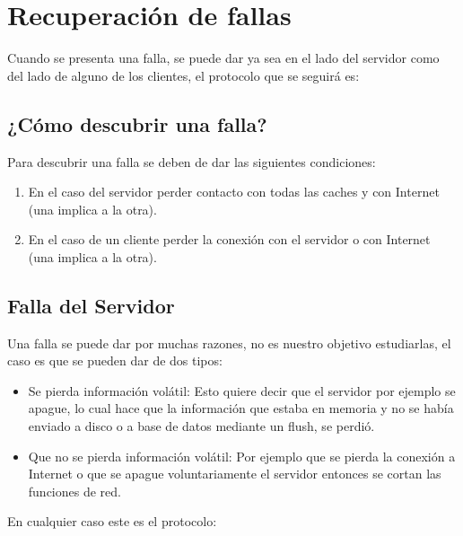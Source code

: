 \section{Recuperación de fallas}
Cuando se presenta una falla, se puede dar ya sea en el lado del servidor como del lado de alguno de los clientes, el protocolo que se seguirá es:

\subsection{¿Cómo descubrir una falla?}
Para descubrir una falla se deben de dar las siguientes condiciones:
\begin{enumerate}
\item En el caso del servidor perder contacto con todas las caches y con Internet (una implica a la otra).
\item En el caso de un cliente perder la conexión con el servidor o con Internet (una implica a la otra). 
\end{enumerate}

\subsection{Falla del Servidor}
Una falla se puede dar por muchas razones, no es nuestro objetivo estudiarlas, el caso es que se pueden dar de dos tipos:

\begin{itemize}
\item Se pierda información volátil: Esto quiere decir que el servidor por ejemplo se apague, lo cual hace que la información que estaba en memoria y no se había enviado a disco o a base de datos mediante un flush, se perdió.
\item Que no se pierda información volátil: Por ejemplo que se pierda la conexión a Internet o que se apague voluntariamente el servidor entonces se cortan las funciones de red.
\end{itemize}

En cualquier caso este es el protocolo:

